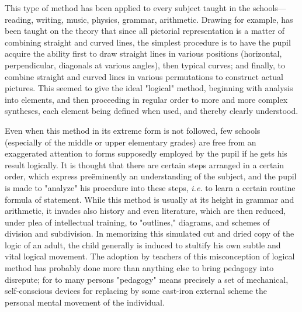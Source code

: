 \documentclass[letterpaper]{book}
\begin{document}

This type of method has been applied to every subject taught in the
schools---reading, writing, music, physics, grammar, arithmetic. Drawing
for
example,
has been taught on the theory that since all pictorial representation is
a matter of combining straight and curved lines, the simplest procedure
is to have the pupil acquire the ability first to draw straight lines in
various positions (horizontal, perpendicular, diagonals at various
angles), then typical curves; and finally, to combine straight and
curved lines in various permutations to construct actual pictures. This
seemed to give the ideal "logical" method, beginning with analysis into
elements, and then proceeding in regular order to more and more complex
syntheses, each element being defined when used, and thereby clearly
understood.


Even when this method in its extreme form is not followed, few schools
(especially of the middle or upper elementary grades) are free from an
exaggerated attention to forms supposedly employed by the pupil if he
gets his result logically. It is thought that there are certain steps
arranged in a certain order, which express preëminently an understanding
of the subject, and the pupil is made to "analyze" his procedure into
these steps, \emph{i.e.} to learn a certain routine formula of
statement. While this method is usually at its height in grammar and
arithmetic, it invades also history and even literature, which are then
reduced, under plea of intellectual training, to "outlines," diagrams,
and schemes of division and subdivision. In memorizing this simulated
cut and dried copy of the logic of an adult, the child generally is
induced to stultify his own subtle and vital logical movement. The
adoption by teachers of this misconception of logical method has
probably done more than anything else to bring pedagogy into disrepute;
for to many persons "pedagogy" means precisely a set of mechanical,
self-conscious devices for replacing by
some
cast-iron external scheme the personal mental movement of the
individual.

\end{document}
